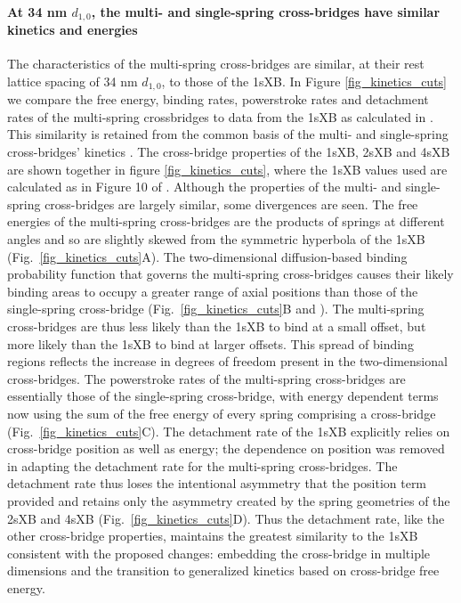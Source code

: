 \documentclass[]{article}
\begin{document}
\paragraph{At 34 nm $d_{1,0}$, the multi- and single-spring cross-bridges have similar kinetics and energies} %
The characteristics of the multi-spring cross-bridges are similar, at their rest lattice spacing of 34 nm $d_{1,0}$, to those of the 1sXB.
In Figure \ref{fig_kinetics_cuts} we compare the free energy, binding rates, powerstroke rates and detachment rates of the multi-spring crossbridges to data from the 1sXB as calculated in \citet{Tanner2007}. 
This similarity is retained from the common basis of the multi- and single-spring cross-bridges' kinetics \citep{Pate1989}.
The cross-bridge properties of the 1sXB, 2sXB and 4sXB are shown together in figure \ref{fig_kinetics_cuts}, where the 1sXB values used are calculated as in Figure 10 of \citet{Tanner2007}. 
Although the properties of the multi- and single-spring cross-bridges are largely similar, some divergences are seen. 
The free energies of the multi-spring cross-bridges are the products of springs at different angles and so are slightly skewed from the symmetric hyperbola of the 1sXB  (Fig.~\ref{fig_kinetics_cuts}A).
The two-dimensional diffusion-based binding probability function that governs the multi-spring cross-bridges causes their likely binding areas to occupy a greater range of axial positions than those of the single-spring cross-bridge (Fig.~\ref{fig_kinetics_cuts}B and \citet{BergBook, DillBook}).
The multi-spring cross-bridges are thus less likely than the 1sXB to bind at a small offset, but more likely than the 1sXB to bind at larger offsets. 
This spread of binding regions reflects the increase in degrees of freedom present in the two-dimensional cross-bridges. 
The powerstroke rates of the multi-spring cross-bridges are essentially those of the single-spring cross-bridge, with energy dependent terms now using the  sum of the free energy of every spring comprising a cross-bridge  (Fig.~\ref{fig_kinetics_cuts}C). 
The detachment rate of the 1sXB explicitly relies on cross-bridge position as well as energy; the dependence on position was removed in adapting the detachment rate for the multi-spring cross-bridges. 
The detachment rate thus loses the intentional asymmetry that the position term provided and retains only the asymmetry created by the spring geometries of the 2sXB and 4sXB (Fig.~\ref{fig_kinetics_cuts}D). 
Thus the detachment rate, like the other cross-bridge properties, maintains the greatest similarity to the 1sXB consistent with the proposed changes: embedding the cross-bridge in multiple dimensions and the transition to generalized kinetics based on cross-bridge free energy. 
\end{document}
